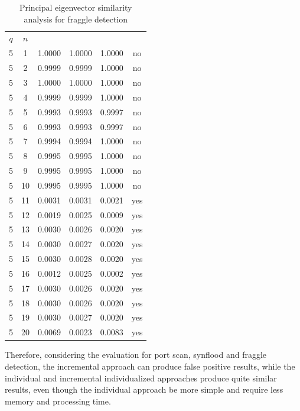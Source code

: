 \begin{table}[h!]
  \centering
  \footnotesize
  \caption{Principal eigenvector similarity analysis for fraggle detection}
  \label{tab:2.07}
  \begin{tabular}{ c c c c c c }
	\toprule
	\multirow{2}{*}{\pmb{Time Frame} $q$} &\multirow{2}{*}{\pmb{Time} $n$}   &\multicolumn{3}{c}{\pmb{Similarity Analysis}} &\multirow{2}{*}{\pmb{Ground Truth}}\\ 
			\hhline{~~---~}
			& &\pmb{Incremental Individualized} &\pmb{Incremental} &\pmb{Individual}\\
	\midrule
	5 &1 &1.0000 &1.0000 &1.0000 &no \\
	5 &2 &0.9999 &0.9999 &1.0000 &no \\
	5 &3 &1.0000 &1.0000 &1.0000 &no \\
	5 &4 &0.9999 &0.9999 &1.0000 &no \\
	5 &5 &0.9993 &0.9993 &0.9997 &no \\
	5 &6 &0.9993 &0.9993 &0.9997 &no \\
	5 &7 &0.9994 &0.9994 &1.0000 &no \\
	5 &8 &0.9995 &0.9995 &1.0000 &no \\
	5 &9 &0.9995 &0.9995 &1.0000 &no \\
	5 &10 &0.9995 &0.9995 &1.0000 &no \\
	5 &11 &0.0031 &0.0031 &0.0021 &yes \\
	5 &12 &0.0019 &0.0025 &0.0009 &yes \\
	5 &13 &0.0030 &0.0026 &0.0020 &yes \\
	5 &14 &0.0030 &0.0027 &0.0020 &yes \\
	5 &15 &0.0030 &0.0028 &0.0020 &yes \\
	5 &16 &0.0012 &0.0025 &0.0002 &yes \\
	5 &17 &0.0030 &0.0026 &0.0020 &yes \\
	5 &18 &0.0030 &0.0026 &0.0020 &yes \\
	5 &19 &0.0030 &0.0027 &0.0020 &yes \\
	5 &20 &0.0069 &0.0023 &0.0083 &yes \\
    \bottomrule
  \end{tabular}
\end{table}

Therefore, considering the evaluation for port scan, synflood and fraggle detection, the incremental approach can produce false positive results, while the individual and incremental individualized approaches produce quite similar results, even though the individual approach be more simple and require less memory and processing time.

